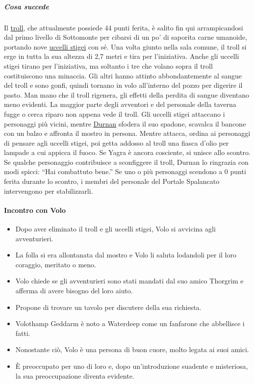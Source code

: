 \documentclass{article}
\begin{document}
                        \subparagraph{Cosa succede}
Il \hyperlink{troll}{ troll}, che attualmente possiede 44 punti ferita, è salito
fin qui arrampicandosi dal primo livello di Sottomonte per
cibarsi di un po' di saporita carne umanoide, portando nove
\hyperlink{uccelli}{uccelli stigei} con sé. Una volta giunto nella sala comune,
il troll si erge in tutta la sua altezza di 2,7 metri e tira per
l'iniziativa. Anche gli uccelli stigei tirano per l'iniziativa,
ma soltanto i tre che volano sopra il troll costituiscono una
minaccia. Gli altri hanno attinto abbondantemente al sangue
del troll e sono gonfi, quindi tornano in volo all’interno del
pozzo per digerire il pasto. Man mano che il troll rigenera,
gli effetti della perdita di sangue diventano meno evidenti.
La maggior parte degli avventori e del personale della
taverna fugge o cerca riparo non appena vede il troll. Gli
uccelli stigei attaccano i personaggi più vicini, mentre
\hyperlink{Duran}{Durnan} sfodera il suo spadone,
scavalca il bancone con un balzo e affronta il mostro in
persona. Mentre attacca, ordina ai personaggi di pensare
agli uccelli stigei, poi getta addosso al troll una fiasca d'olio
per lampade a cui appicca il fuoco. Se Yagra è ancora
cosciente, si unisce allo scontro. Se qualche personaggio
contribuisce a sconfiggere il troll, Durnan lo ringrazia con
modi spicci: “Hai combattuto bene.”
Se uno o più personaggi scendono a 0 punti ferita
durante lo scontro, i membri del personale del Portale
Spalancato intervengono per stabilizzarli.

                \paragraph{Incontro con Volo} 
                \begin{itemize}
                    \item Dopo aver eliminato il troll e gli uccelli stigei, Volo si avvicina agli avventurieri.
                    \item La folla si era allontanata dal mostro e Volo li saluta lodandoli per il loro coraggio, meritato o meno.
                    \item Volo chiede se gli avventurieri sono stati mandati dal suo amico Thorgrim e afferma di avere bisogno del loro aiuto.
                    \item Propone di trovare un tavolo per discutere della sua richiesta.
                    \item Volothamp Geddarm è noto a Waterdeep come un fanfarone che abbellisce i fatti.
                    \item Nonostante ciò, Volo è una persona di buon cuore, molto legata ai suoi amici.
                    \item È preoccupato per uno di loro e, dopo un'introduzione suadente e misteriosa, la sua preoccupazione diventa evidente.
                \end{itemize}
\end{document}
